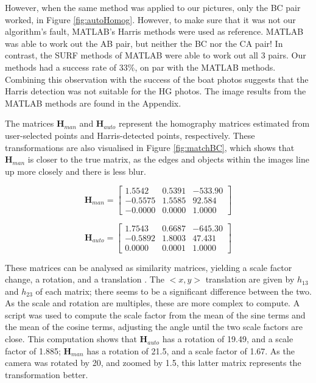 \documentclass[a4paper, 10pt, conference]{ieeeconf}
\begin{document}
However, when the same method was applied to our pictures, only the BC pair worked, in Figure \ref{fig:autoHomog}. However, to make sure that it was not our algorithm's fault, MATLAB's Harris methods were used as reference. MATLAB was able to work out the AB pair, but neither the BC nor the CA pair! In contrast, the SURF methods of MATLAB were able to work out all 3 pairs. Our methods had a success rate of 33\%, on par with the MATLAB methods. Combining this observation with the success of the boat photos suggests that the Harris detection was not suitable for the HG photos. The image results from the MATLAB methods are found in the Appendix.


The matrices $\textbf{H}_{man}$ and $\textbf{H}_{auto}$ represent the homography matrices estimated from user-selected points and Harris-detected points, respectively. These transformations are also visualised in Figure \ref{fig:matchBC}, which shows that $\textbf{H}_{man}$ is closer to the true matrix, as the edges and objects within the images line up more closely and there is less blur.


\begin{equation} \label{eqn:manHomog}
\textbf{H}_{man} = \begin{bmatrix}
     1.5542 &  0.5391 & -533.90 \\
    -0.5575 &  1.5585 &  92.584 \\
    -0.0000 &  0.0000 &  1.0000
\end{bmatrix}
\end{equation}

\begin{equation} \label{eqn:autoHomog}
\textbf{H}_{auto} = \begin{bmatrix}
     1.7543 &  0.6687 & -645.30 \\
    -0.5892 &  1.8003 &  47.431 \\
     0.0000 &  0.0001 &  1.0000
\end{bmatrix}
\end{equation}

These matrices can be analysed as similarity matrices, yielding a scale factor change, a rotation, and a translation \cite{notes}. The $<x, y>$ translation are given by $h_{13}$ and $h_{23}$ of each matrix; there seems to be a significant difference between the two. As the scale and rotation are multiples, these are more complex to compute. A script was used to compute the scale factor from the mean of the sine terms and the mean of the cosine terms, adjusting the angle until the two scale factors are close. This computation shows that $\textbf{H}_{auto}$ has a rotation of 19.49\degree, and a scale factor of 1.885; $\textbf{H}_{man}$ has a rotation of 21.5\degree, and a scale factor of 1.67. As the camera was rotated by 20\degree, and zoomed by 1.5, this latter matrix represents the transformation better.
\end{document}
